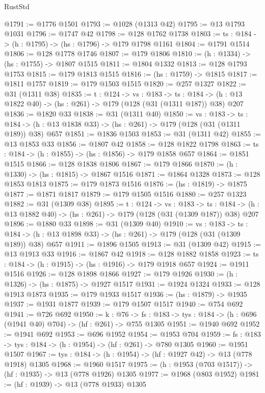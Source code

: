 \begin{lexlean}{RustStd}
\begin{coremodule}
{\begin{coremodule}
{{{{@1791 := @1776 @1501
@1793 := @1028 (@1313 @42)
@1795 := @13 @1793 @1031
@1796 := @1747 @42
@1798 := @128 @1762 @1738
@1803 := {ts : @184} -> (h : @1795) -> (hs : @1796) -> @179 @1798 @1161
@1804 := @1791 @1514
@1806 := @128 @1778 @1746
@1807 := @179 @1806
@1810 := (h : @1334) -> (hs : @1755) -> @1807 @1515
@1811 := @1804 @1332
@1813 := @128 @1793 @1753
@1815 := @179 @1813 @1515
@1816 := (hs : @1759) -> @1815
@1817 := @1811 @1757
@1819 := @179 @1503 @1515
@1820 := @257 @1327
@1822 := @31 (@1311 @38)
@1835 := {t : @124} ->
  {vs : @183} ->
  {ts : @184} -> (h : @13 @1822 @40) -> (hs : @261) -> @179 (@128 (@31 (@1311 @187)) @38) @207
@1836 := @1820 @33
@1838 := @31 (@1311 @40)
@1850 := {vs : @183} ->
  {ts : @184} -> (h : @13 @1838 @33) -> (hs : @261) -> @179 (@128 (@31 (@1311 @189)) @38) @657
@1851 := @1836 @1503
@1853 := @31 (@1311 @42)
@1855 := @13 @1853 @33
@1856 := @1807 @42
@1858 := @128 @1822 @1798
@1863 := {ts : @184} -> (h : @1855) -> (hs : @1856) -> @179 @1858 @657
@1864 := @1851 @1515
@1866 := @128 @1838 @1806
@1867 := @179 @1866
@1870 := (h : @1330) -> (hs : @1815) -> @1867 @1516
@1871 := @1864 @1328
@1873 := @128 @1853 @1813
@1875 := @179 @1873 @1516
@1876 := (hs : @1819) -> @1875
@1877 := @1871 @1817
@1879 := @179 @1505 @1516
@1880 := @257 @1323
@1882 := @31 (@1309 @38)
@1895 := {t : @124} ->
  {vs : @183} ->
  {ts : @184} -> (h : @13 @1882 @40) -> (hs : @261) -> @179 (@128 (@31 (@1309 @187)) @38) @207
@1896 := @1880 @33
@1898 := @31 (@1309 @40)
@1910 := {vs : @183} ->
  {ts : @184} -> (h : @13 @1898 @33) -> (hs : @261) -> @179 (@128 (@31 (@1309 @189)) @38) @657
@1911 := @1896 @1505
@1913 := @31 (@1309 @42)
@1915 := @13 @1913 @33
@1916 := @1867 @42
@1918 := @128 @1882 @1858
@1923 := {ts : @184} -> (h : @1915) -> (hs : @1916) -> @179 @1918 @657
@1924 := @1911 @1516
@1926 := @128 @1898 @1866
@1927 := @179 @1926
@1930 := (h : @1326) -> (hs : @1875) -> @1927 @1517
@1931 := @1924 @1324
@1933 := @128 @1913 @1873
@1935 := @179 @1933 @1517
@1936 := (hs : @1879) -> @1935
@1937 := @1931 @1877
@1939 := @179 @1507 @1517
@1940 := @754 @692
@1941 := @726 @692
@1950 := {k : @76} ->
  {fs : @183} -> {tys : @184} -> (h : @696 (@1941 @40) @704) -> (hf : @261) -> @755 @1305
@1951 := @1940 @692
@1952 := @1941 @692
@1953 := @696 @1952
@1954 := @1953 @704
@1959 := {fs : @183} -> {tys : @184} -> (h : @1954) -> (hf : @261) -> @780 @1305
@1960 := @1951 @1507
@1967 := {tys : @184} -> (h : @1954) -> (hf : @1927 @42) -> @13 (@778 @1918) @1305
@1968 := @1960 @1517
@1975 := (h : @1953 (@703 @1517)) -> (hf : @1935) -> @13 (@778 @1926) @1305
@1977 := @1968 (@803 @1952)
@1981 := (hf : @1939) -> @13 (@778 @1933) @1305
}}}}
\end{coremodule}}
\end{coremodule}
\end{lexlean}
